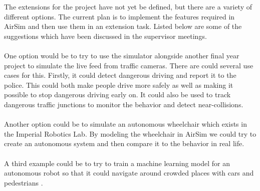 The extensions for the project have not yet be defined, but there are a variety of different options. The current plan is to implement the features required in AirSim and then use them in an extension task. Listed below are some of the suggestions which have been discussed in the supervisor meetings. 
\\~\\
One option would be to try to use the simulator alongside another final year project to simulate the live feed from traffic cameras. There are could several use cases for this. Firstly, it could detect dangerous driving and report it to the police. This could both make people drive more safely as well as making it possible to stop dangerous driving early on. It could also be used to track dangerous traffic junctions to monitor the behavior and detect near-collisions. 
\\~\\
Another option could be to simulate an autonomous wheelchair which exists in the Imperial Robotics Lab. By modeling the wheelchair in AirSim we could try to create an autonomous system and then compare it to the behavior in real life.
\\~\\
A third example could be to try to train a machine learning model for an autonomous robot so that it could navigate around crowded places with cars and pedestrians \cite{ChaoQianwen2015Vifm}. 
\\~\\